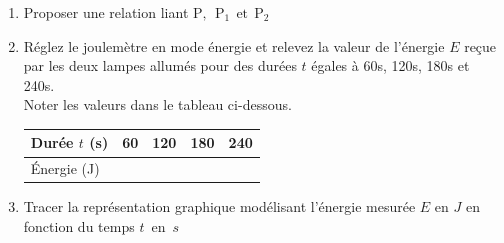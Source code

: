 \documentclass[11pt,a4paper]{article}
\newcommand{\cadreblanc}[1]{%
\medskip\framebox[\linewidth][c]{%
\rule{0mm}{#1mm}}\par
\medskip}
\begin{document}
\begin{enumerate}[label=3.\arabic*]
    \vspace{3mm}
    \begin{center}
        \vspace{-5mm} 
    \end{center}

    \item  Proposer une relation liant $\mathrm{P,~~ P_1 ~~et~~ P_2}$ \\ 

    \begin{center}
        \begin{minipage}{5cm}
        \cadreblanc{10}
        \end{minipage}
    \end{center}










    
   \item Réglez le joulemètre en mode énergie et relevez la valeur de l'énergie $E$ reçue par les deux lampes allumés pour des durées $t$ égales à 60s, 120s, 180s et 240s. \\ Noter les valeurs dans le tableau ci-dessous. 


\begin{center}
    

    \begin{tabular}{|C{2cm}||C{2cm}|C{2cm}|C{2cm}|C{2cm}|}
         \hline
         Durée $t$ (s)& 60 & 120 & 180 & 240\\
         \hline
         Énergie (J)&  &  &  & \\
         \hline
    \end{tabular}
\end{center}

\newpage

     \item  Tracer la représentation graphique modélisant l'énergie mesurée $E$ en $J$ en fonction du temps $t$~en~$s$ \\[1.5 cm]

\begin{center}
    




\end{center}
\end{enumerate}
\end{document}
